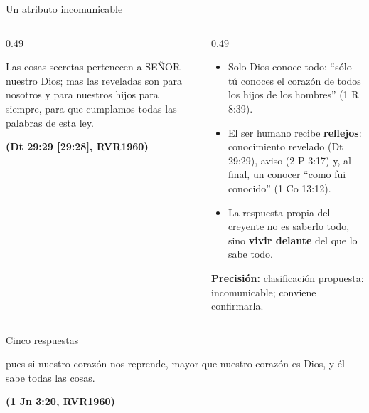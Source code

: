 \documentclass[hyperref={bookmarks=false},aspectratio=169]{beamer}
\newcommand{\SENOR}{S{\fontsize{0.78em}{1em}\selectfont EÑOR}}
\newcommand{\fuente}[1]{\par\hfill{\upshape\bfseries\footnotesize\textcolor{azul}{#1}}}
\newcommand{\destacar}[1]{\textbf{\textcolor{azul}{#1}}}
\newcommand{\precision}[1]{{\footnotesize\color{gris}\textbf{Precisión:} #1}}
\begin{document}
\begin{frame}{Un atributo incomunicable}
\begin{columns}[t,onlytextwidth]
\begin{column}{0.49\textwidth}
\begin{cita}Las cosas secretas pertenecen a \SENOR{} nuestro Dios; mas las reveladas son para nosotros y para nuestros hijos para siempre, para que cumplamos todas las palabras de esta ley.\fuente{(Dt 29:29 [29:28], RVR1960)}\end{cita}
\end{column}
\begin{column}{0.49\textwidth}\small
\begin{itemize}
\item Solo Dios conoce todo: ``sólo tú conoces el corazón de todos los hijos de los hombres'' (1 R 8:39).
\item El ser humano recibe \destacar{reflejos}: conocimiento revelado (Dt 29:29), aviso (2 P 3:17) y, al final, un conocer ``como fui conocido'' (1 Co 13:12).
\item La respuesta propia del creyente no es saberlo todo, sino \destacar{vivir delante} del que lo sabe todo.
\end{itemize}
\precision{clasificación propuesta: incomunicable; conviene confirmarla.}
\end{column}
\end{columns}
\end{frame}

\begin{frame}{Cinco respuestas}
\centering
{}\par\medskip
\begin{cita}pues si nuestro corazón nos reprende, mayor que nuestro corazón es Dios, y él sabe todas las cosas.\fuente{(1 Jn 3:20, RVR1960)}\end{cita}
\end{frame}
\end{document}
